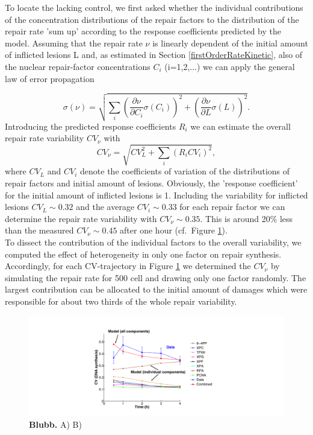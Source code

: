 To locate the lacking control, we first asked whether the individual contributions of the concentration distributions of the repair factors to the distribution of the repair rate 'sum up' according to the response coefficients predicted by the model. Assuming that the repair rate $\nu$ is linearly dependent of the initial amount of inflicted lesions L and, as estimated in Section \ref{firstOrderRateKinetic}, also of the nuclear repair-factor concentrations $C_i$ (i=1,2,...) we can apply the general law of error propagation

\begin{equation}
\sigma(\nu) = \sqrt{\sum_{i}\left(\frac{\partial \nu}{\partial C_i}\sigma(C_i) \right)^2 + \left(\frac{\partial \nu}{\partial L}\sigma(L)\right)^2 }.
\label{eqn:lawoferrorPropagation}
\end{equation} 
Introducing the predicted response coefficients $R_i$ we can estimate the overall repair rate variability $CV_{\nu}$ with
\begin{equation}
CV_{\nu} = \sqrt{CV_{L}^2 + \sum_{i}(R_iCV_i)^2},
\label{eqn:lawOfErrorPropI}
\end{equation}
where $CV_{L}$ and $CV_i$ denote the coefficients of variation of the distributions of repair factors and initial amount of lesions. Obviously, the 'response coefficient' for the initial amount of inflicted lesions is 1. Including the variability for inflicted lesions $CV_L \sim 0.32$ and the average $CV_i \sim 0.33$ for each repair factor we can determine the repair rate variability with $CV_{\nu} \sim 0.35$. This is around 20\% less than the measured $CV_{\nu} \sim 0.45$ after one hour (cf.\ Figure \ref{fig:CV_Var_comp}).\\
To dissect the contribution of the individual factors to the
overall variability, we computed the effect of heterogeneity in only one factor on repair synthesis. Accordingly, for each CV-trajectory in Figure \ref{fig:CV_Var_comp} we determined the $CV_{\nu}$ by simulating the repair rate for 500 cell and drawing only one factor randomly. The largest contribution can be allocated to the initial amount of damages which were responsible for about two thirds of the whole repair variability. 

\begin{figure}[htbp]
	\begin{center}
		\includegraphics[width=1\textwidth]{Abbildungen/figure3_8.pdf}
		\caption{\textbf{Blubb.} A) B) }
		\label{fig:CV_Var_comp}
	\end{center}
\end{figure}



